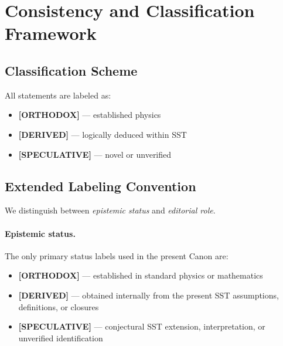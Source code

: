 \documentclass[11pt]{article}
\theoremstyle{definition}
\theoremstyle{plain}
\theoremstyle{remark}
\begin{document}
        
\section{Consistency and Classification Framework}
    \label{sec:consistency}
    
    \subsection{Classification Scheme}
        
        All statements are labeled as:
        
        \begin{itemize}
            \item \textbf{[ORTHODOX]} — established physics
            \item \textbf{[DERIVED]} — logically deduced within SST
            \item \textbf{[SPECULATIVE]} — novel or unverified
        \end{itemize}

    \subsection{Extended Labeling Convention}

        We distinguish between \emph{epistemic status} and \emph{editorial role}.

        \paragraph{Epistemic status.}
        The only primary status labels used in the present Canon are:
        \begin{itemize}
            \item \textbf{[ORTHODOX]} --- established in standard physics or mathematics
            \item \textbf{[DERIVED]} --- obtained internally from the present SST assumptions, definitions, or closures
            \item \textbf{[SPECULATIVE]} --- conjectural SST extension, interpretation, or unverified identification
        \end{itemize}
\end{document}
